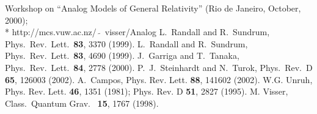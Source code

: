 \documentclass[a4paper,prl,showpacs,twocolumn]{revtex4}
\begin{document}
\begin{thebibliography}{99}

Workshop on ``Analog Models of General Relativity'' (Rio de Janeiro,
October, 2000); 
\\*
{\sf http://mcs.vuw.ac.nz/~$\tilde{}$~visser/Analog}
L.~Randall and R.~Sundrum,
Phys.\ Rev.\ Lett.\  {\bf 83}, 3370 (1999).
L.~Randall and R.~Sundrum,
Phys.\ Rev.\ Lett.\  {\bf 83}, 4690 (1999).
J.~Garriga and T.~Tanaka, 
Phys.\ Rev.\ Lett.\ {\bf 84}, 2778 (2000). 
P.~J.~Steinhardt and N.~Turok,
Phys.\ Rev.\ D {\bf 65}, 126003 (2002).
A.~Campos,
  Phys. Rev. Lett. {\bf 88}, 141602 (2002).
W.G. Unruh, 
Phys. Rev. Lett. {\bf 46}, 1351 (1981);
Phys. Rev. D {\bf 51}, 2827 (1995). 
M. Visser,
Class.~Quantum Grav.~ {\bf 15}, 1767 (1998).

\end{thebibliography}
\end{document}
